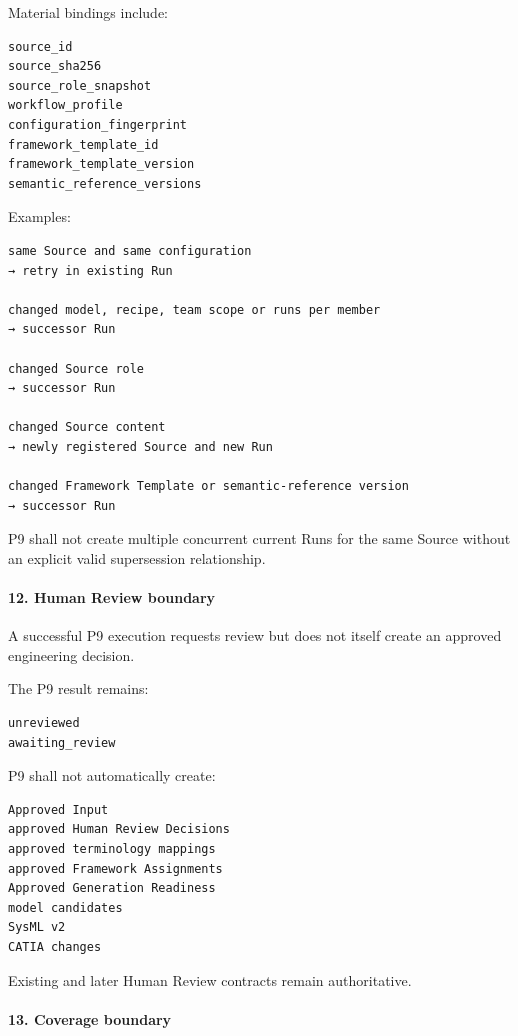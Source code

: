 Material bindings include:

\begin{verbatim}
source_id
source_sha256
source_role_snapshot
workflow_profile
configuration_fingerprint
framework_template_id
framework_template_version
semantic_reference_versions
\end{verbatim}

Examples:

\begin{verbatim}
same Source and same configuration
→ retry in existing Run

changed model, recipe, team scope or runs per member
→ successor Run

changed Source role
→ successor Run

changed Source content
→ newly registered Source and new Run

changed Framework Template or semantic-reference version
→ successor Run
\end{verbatim}

P9 shall not create multiple concurrent current Runs for the same Source without an explicit valid supersession relationship.

\hypertarget{12-human-review-boundary}{%
\paragraph{12. Human Review boundary}\label{12-human-review-boundary}}

A successful P9 execution requests review but does not itself create an approved engineering decision.

The P9 result remains:

\begin{verbatim}
unreviewed
awaiting_review
\end{verbatim}

P9 shall not automatically create:

\begin{verbatim}
Approved Input
approved Human Review Decisions
approved terminology mappings
approved Framework Assignments
Approved Generation Readiness
model candidates
SysML v2
CATIA changes
\end{verbatim}

Existing and later Human Review contracts remain authoritative.

\hypertarget{13-coverage-boundary}{%
\paragraph{13. Coverage boundary}\label{13-coverage-boundary}}

